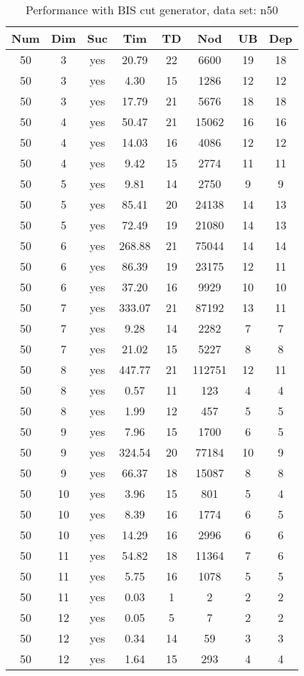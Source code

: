 \begin{table}[!htb]
  \centering
  \begin{tabular}[center]{|c|c|c|c|c|c|c|c|}
    \hline
    Num & Dim & Suc & Tim & TD & Nod & UB & Dep \\
    \hline
    50 & 3 & yes & 20.79 & 22 & 6600 & 19 & 18 \\
    50 & 3 & yes & 4.30 & 15 & 1286 & 12 & 12 \\
    50 & 3 & yes & 17.79 & 21 & 5676 & 18 & 18 \\
    50 & 4 & yes & 50.47 & 21 & 15062 & 16 & 16 \\
    50 & 4 & yes & 14.03 & 16 & 4086 & 12 & 12 \\
    50 & 4 & yes & 9.42 & 15 & 2774 & 11 & 11 \\
    50 & 5 & yes & 9.81 & 14 & 2750 & 9 & 9 \\
    50 & 5 & yes & 85.41 & 20 & 24138 & 14 & 13 \\
    50 & 5 & yes & 72.49 & 19 & 21080 & 14 & 13 \\
    50 & 6 & yes & 268.88 & 21 & 75044 & 14 & 14 \\
    50 & 6 & yes & 86.39 & 19 & 23175 & 12 & 11 \\
    50 & 6 & yes & 37.20 & 16 & 9929 & 10 & 10 \\
    50 & 7 & yes & 333.07 & 21 & 87192 & 13 & 11 \\
    50 & 7 & yes & 9.28 & 14 & 2282 & 7 & 7 \\
    50 & 7 & yes & 21.02 & 15 & 5227 & 8 & 8 \\
    50 & 8 & yes & 447.77 & 21 & 112751 & 12 & 11 \\
    50 & 8 & yes & 0.57 & 11 & 123 & 4 & 4 \\
    50 & 8 & yes & 1.99 & 12 & 457 & 5 & 5 \\
    50 & 9 & yes & 7.96 & 15 & 1700 & 6 & 5 \\
    50 & 9 & yes & 324.54 & 20 & 77184 & 10 & 9 \\
    50 & 9 & yes & 66.37 & 18 & 15087 & 8 & 8 \\
    50 & 10 & yes & 3.96 & 15 & 801 & 5 & 4 \\
    50 & 10 & yes & 8.39 & 16 & 1774 & 6 & 5 \\
    50 & 10 & yes & 14.29 & 16 & 2996 & 6 & 6 \\
    50 & 11 & yes & 54.82 & 18 & 11364 & 7 & 6 \\
    50 & 11 & yes & 5.75 & 16 & 1078 & 5 & 5 \\
    50 & 11 & yes & 0.03 & 1 & 2 & 2 & 2 \\
    50 & 12 & yes & 0.05 & 5 & 7 & 2 & 2 \\
    50 & 12 & yes & 0.34 & 14 & 59 & 3 & 3 \\
    50 & 12 & yes & 1.64 & 15 & 293 & 4 & 4 \\
    \hline
  \end{tabular}
  \caption{Performance with BIS cut generator, data set: n50}
  \label{tab:test.cutbis-n50}
\end{table}

